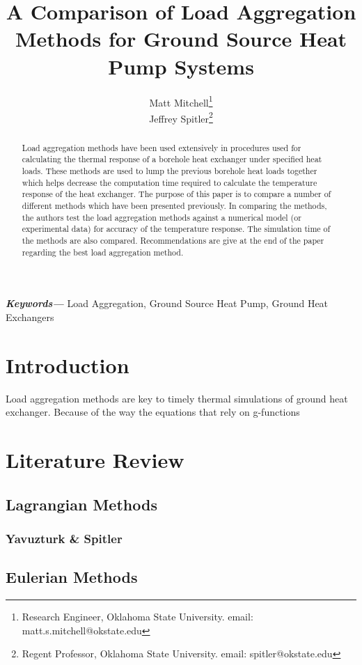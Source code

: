 \documentclass{article}
\title{A Comparison of Load Aggregation Methods for Ground Source Heat Pump Systems}
\author{Matt Mitchell\footnote{Research Engineer, Oklahoma State University. email: matt.s.mitchell@okstate.edu} \\ Jeffrey Spitler\footnote{Regent Professor, Oklahoma State University. email: spitler@okstate.edu}}
\providecommand{\keywords}[1]{\textbf{\textit{Keywords---}} #1}
\begin{document}
\maketitle
{}

\begin{abstract}
Load aggregation methods have been used extensively in procedures used for calculating the thermal response of a borehole heat exchanger under specified heat loads. These methods are used to lump the previous borehole heat loads together which helps decrease the computation time required to calculate the temperature response of the heat exchanger. The purpose of this paper is to compare a number of different methods which have been presented previously. In comparing the methods, the authors test the load aggregation methods against a numerical model (or experimental data) for accuracy of the temperature response. The simulation time of the methods are also compared. Recommendations are give at the end of the paper regarding the best load aggregation method.
\end{abstract}

\keywords{Load Aggregation, Ground Source Heat Pump, Ground Heat Exchangers}

\section{Introduction}

Load aggregation methods are key to timely thermal simulations of ground heat exchanger. Because of the way the equations that rely on g-functions \cite{Adams_Schweickart_1987}


\section{Literature Review}

\subsection{Lagrangian Methods}

\subsubsection{Yavuzturk \& Spitler}

\subsection{Eulerian Methods}
\end{document}
